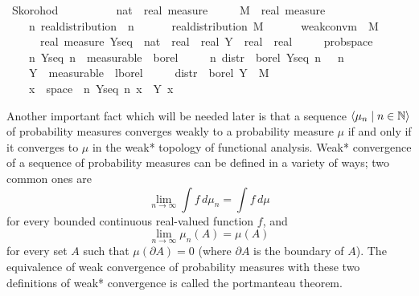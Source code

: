 \documentclass{article}
\theoremstyle{definition}
\newcommand{\bldseq}[2]{\langle{#1}\mid{#2}\rangle}
\begin{document}
\begin{isabellebody}
\isamarkupfalse%
\ Skorohod{\isacharcolon}\isanewline
\ \ \ \isanewline
\ \ \ \ {\isasymmu}\ {\isacharcolon}{\isacharcolon}\ {\isachardoublequoteopen}nat\ {\isasymRightarrow}\ real\ measure{\isachardoublequoteclose}\ \isanewline
\ \ \ \ M\ {\isacharcolon}{\isacharcolon}\ {\isachardoublequoteopen}real\ measure{\isachardoublequoteclose}\isanewline
\ \ \ \isanewline
\ \ \ \ {\isachardoublequoteopen}{\isasymAnd}n{\isachardot}\ real{\isacharunderscore}distribution\ {\isacharparenleft}{\isasymmu}\ n{\isacharparenright}{\isachardoublequoteclose}\ \ \isanewline
\ \ \ \ {\isachardoublequoteopen}real{\isacharunderscore}distribution\ M{\isachardoublequoteclose}\ \ \isanewline
\ \ \ \ {\isachardoublequoteopen}weak{\isacharunderscore}conv{\isacharunderscore}m\ {\isasymmu}\ M{\isachardoublequoteclose}\isanewline
\ \ \ {\isachardoublequoteopen}{\isasymexists}\ {\isacharparenleft}{\isasymOmega}\ {\isacharcolon}{\isacharcolon}\ real\ measure{\isacharparenright}\ {\isacharparenleft}Y{\isacharunderscore}seq\ {\isacharcolon}{\isacharcolon}\ nat\ {\isasymRightarrow}\ real\ {\isasymRightarrow}\ real{\isacharparenright}\ {\isacharparenleft}Y\ {\isacharcolon}{\isacharcolon}\ real\ {\isasymRightarrow}\ real{\isacharparenright}{\isachardot}\ \isanewline
\ \ \ \ prob{\isacharunderscore}space\ {\isasymOmega}\ {\isasymand}\isanewline
\ \ \ \ {\isacharparenleft}{\isasymforall}n{\isachardot}\ Y{\isacharunderscore}seq\ n\ {\isasymin}\ measurable\ {\isasymOmega}\ borel{\isacharparenright}\ {\isasymand}\isanewline
\ \ \ \ {\isacharparenleft}{\isasymforall}n{\isachardot}\ distr\ {\isasymOmega}\ borel\ {\isacharparenleft}Y{\isacharunderscore}seq\ n{\isacharparenright}\ {\isacharequal}\ {\isasymmu}\ n{\isacharparenright}\ {\isasymand}\isanewline
\ \ \ \ Y\ {\isasymin}\ measurable\ {\isasymOmega}\ lborel\ {\isasymand}\isanewline
\ \ \ \ distr\ {\isasymOmega}\ borel\ Y\ {\isacharequal}\ M\ {\isasymand}\isanewline
\ \ \ \ {\isacharparenleft}{\isasymforall}x\ {\isasymin}\ space\ {\isasymOmega}{\isachardot}\ {\isacharparenleft}{\isasymlambda}n{\isachardot}\ Y{\isacharunderscore}seq\ n\ x{\isacharparenright}\ {\isacharminus}{\isacharminus}{\isacharminus}{\isacharminus}{\isachargreater}\ Y\ x{\isacharparenright}{\isachardoublequoteclose}
\end{isabellebody}

\medskip

Another important fact which will be needed later is that a sequence $\bldseq{\mu_n}{n \in \N}$ of probability measures converges weakly to a probability measure $\mu$ if and only if it converges to $\mu$ in the weak* topology of functional analysis. Weak* convergence of a sequence of probability measures can be defined in a variety of ways; two common ones are
\[ \lim_{n \rightarrow \infty} \int f \, d\mu_n = \int f \, d\mu \]
for every bounded continuous real-valued function $f$, and
\[ \lim_{n \rightarrow \infty} \mu_n(A) = \mu(A) \]
for every set $A$ such that $\mu(\partial A) = 0$ (where $\partial A$ is the boundary of $A$). The equivalence of weak convergence of probability measures with these two definitions of weak* convergence is called the portmanteau theorem.
\end{document}
